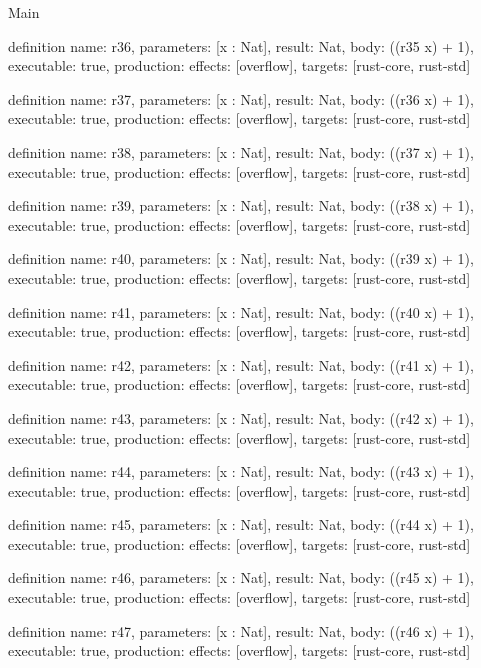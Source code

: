 \begin{lexlean}{Main}
\begin{semanticmodule}
definition{
  name: r36,
  parameters: [x : Nat],
  result: Nat,
  body: ((r35 x) + 1),
  executable: true,
  production: {effects: [overflow], targets: [rust-core, rust-std]}
}

definition{
  name: r37,
  parameters: [x : Nat],
  result: Nat,
  body: ((r36 x) + 1),
  executable: true,
  production: {effects: [overflow], targets: [rust-core, rust-std]}
}

definition{
  name: r38,
  parameters: [x : Nat],
  result: Nat,
  body: ((r37 x) + 1),
  executable: true,
  production: {effects: [overflow], targets: [rust-core, rust-std]}
}

definition{
  name: r39,
  parameters: [x : Nat],
  result: Nat,
  body: ((r38 x) + 1),
  executable: true,
  production: {effects: [overflow], targets: [rust-core, rust-std]}
}

definition{
  name: r40,
  parameters: [x : Nat],
  result: Nat,
  body: ((r39 x) + 1),
  executable: true,
  production: {effects: [overflow], targets: [rust-core, rust-std]}
}

definition{
  name: r41,
  parameters: [x : Nat],
  result: Nat,
  body: ((r40 x) + 1),
  executable: true,
  production: {effects: [overflow], targets: [rust-core, rust-std]}
}

definition{
  name: r42,
  parameters: [x : Nat],
  result: Nat,
  body: ((r41 x) + 1),
  executable: true,
  production: {effects: [overflow], targets: [rust-core, rust-std]}
}

definition{
  name: r43,
  parameters: [x : Nat],
  result: Nat,
  body: ((r42 x) + 1),
  executable: true,
  production: {effects: [overflow], targets: [rust-core, rust-std]}
}

definition{
  name: r44,
  parameters: [x : Nat],
  result: Nat,
  body: ((r43 x) + 1),
  executable: true,
  production: {effects: [overflow], targets: [rust-core, rust-std]}
}

definition{
  name: r45,
  parameters: [x : Nat],
  result: Nat,
  body: ((r44 x) + 1),
  executable: true,
  production: {effects: [overflow], targets: [rust-core, rust-std]}
}

definition{
  name: r46,
  parameters: [x : Nat],
  result: Nat,
  body: ((r45 x) + 1),
  executable: true,
  production: {effects: [overflow], targets: [rust-core, rust-std]}
}

definition{
  name: r47,
  parameters: [x : Nat],
  result: Nat,
  body: ((r46 x) + 1),
  executable: true,
  production: {effects: [overflow], targets: [rust-core, rust-std]}
}


\end{semanticmodule}
\end{lexlean}
